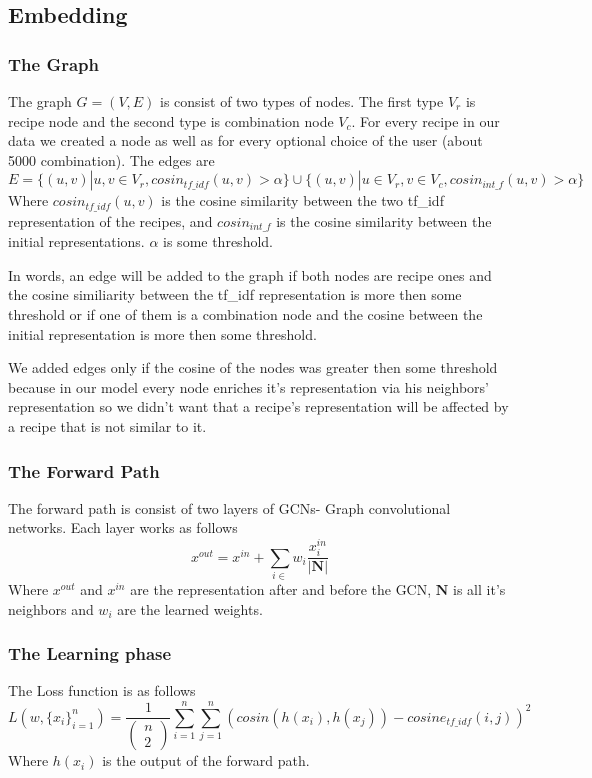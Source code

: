 \documentclass[]{article}
\begin{document}
\subsection{Embedding}
\subsubsection{The Graph}
The graph $G=(V,E)$ is consist of two types of nodes. The first type $V_r$ is recipe node and the second type is combination node $V_c$. For every recipe in our data we created a node as well as for every optional choice of the user (about 5000 combination). The edges are 
$$E = \{(u,v)|u,v \in V_r, cosin_{tf\_idf}(u,v)>\alpha\}\cup\{(u,v)|u\in V_r, v\in V_c, cosin_{int\_f}(u,v)>\alpha\}$$
Where $cosin_{tf\_idf}(u,v)$ is the cosine similarity between the two tf\_idf representation of the recipes, and $cosin_{int\_f}$ is the cosine similarity between the initial representations. $\alpha$ is some threshold.

In words, an edge will be added to the graph if both nodes are recipe ones and the cosine similiarity between the tf\_idf representation is more then some threshold or if one of them is a combination node and the cosine between the initial representation is more then some threshold.

We added edges only if the cosine of the nodes was greater then some threshold because in our model every node enriches it's representation via his neighbors' representation so we didn't want that a recipe's representation will be affected by a recipe that is not similar to it.

\subsubsection{The Forward Path}
The forward path is consist of two layers of GCNs- Graph convolutional networks.
Each layer works as follows 
$$x^{out} = x^{in} + \sum_{i \in } w_i \frac{x^{in}_{i}}{|\mathbf{N}|}$$
Where $x^{out}$ and $x^{in}$ are the representation after and before the GCN, $\mathbf{N}$ is all it's neighbors and $w_i$ are the learned weights.

\subsubsection{The Learning phase}
The Loss function is as follows 
$$L(w,\{x_i\}_{i=1}^{n}) = \frac{1}{\begin{pmatrix} n \\ 2 \end{pmatrix}}\sum_{i=1}^{n}\sum_{j=1}^{n}\left(cosin(h(x_i),h(x_j))-cosine_{tf\_idf}(i,j)\right)^2$$
Where $h(x_i)$ is the output of the forward path.
\end{document}
